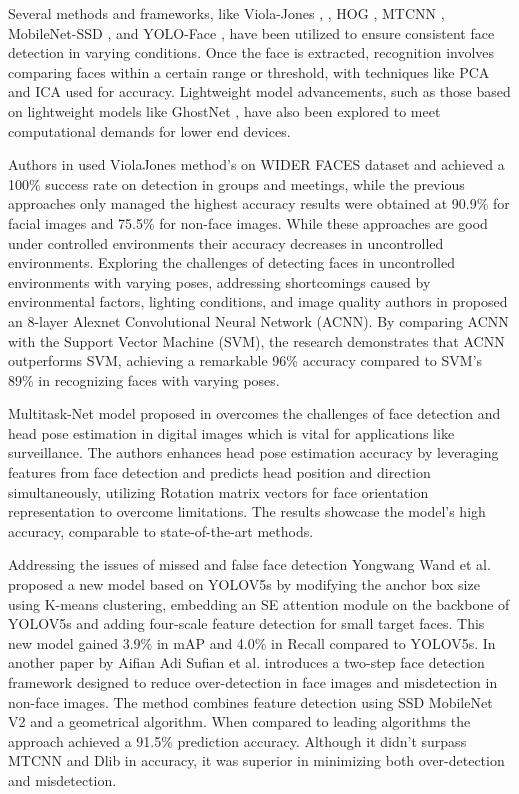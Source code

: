 Several methods and frameworks, like Viola-Jones \cite{sumanto_viola-jones_2022}, \cite{rani_face_2022}, HOG \cite{rani_face_2022}, MTCNN \cite{rani_face_2022}, MobileNet-SSD \cite{chan_face_2022}, and YOLO-Face \cite{wang_yolov5s-face_2022}, have been utilized to ensure consistent face detection in varying conditions. Once the face is extracted, recognition involves comparing faces within a certain range or threshold, with techniques like PCA and ICA used for accuracy. Lightweight model advancements, such as those based on lightweight models like GhostNet \cite{alansari_ghostfacenets_2023}, have also been explored to meet computational demands for lower end devices.

Authors in \cite{sumanto_viola-jones_2022} used ViolaJones method's on WIDER FACES dataset and achieved a 100\% success rate on detection in groups and meetings, while the previous approaches only managed the highest accuracy results were obtained at 90.9\% for facial images and 75.5\% for non-face images. While these approaches are good under controlled environments their accuracy decreases in uncontrolled environments. Exploring the challenges of detecting faces in uncontrolled environments with varying poses, addressing shortcomings caused by environmental factors, lighting conditions, and image quality authors in \cite{mahesh_smart_2022} proposed an 8-layer Alexnet Convolutional Neural Network (ACNN). By comparing ACNN with the Support Vector Machine (SVM), the research demonstrates that ACNN outperforms SVM, achieving a remarkable 96\% accuracy compared to SVM's 89\% in recognizing faces with varying poses.

Multitask-Net model proposed in \cite{viet_simultaneous_2021} overcomes the challenges of face detection and head pose estimation in digital images which is vital for applications like surveillance. The authors enhances head pose estimation accuracy by leveraging features from face detection and predicts head position and direction simultaneously, utilizing Rotation matrix vectors for face orientation representation to overcome limitations. The results showcase the model's high accuracy, comparable to state-of-the-art methods.

Addressing the issues of missed and false face detection Yongwang Wand et al. \cite{wang_yolov5s-face_2022} proposed a new model based on YOLOV5s by modifying the anchor box size using K-means clustering, embedding an SE attention module on the backbone of YOLOV5s and adding four-scale feature detection for small target faces. This new model gained 3.9\% in mAP and 4.0\% in Recall compared to YOLOV5s. In another paper by Aifian Adi Sufian et al. \cite{chan_face_2022} introduces a two-step face detection framework designed to reduce over-detection in face images and misdetection in non-face images. The method combines feature detection using SSD MobileNet V2 and a geometrical algorithm. When compared to leading algorithms the approach achieved a 91.5\% prediction accuracy. Although it didn't surpass MTCNN and Dlib in accuracy, it was superior in minimizing both over-detection and misdetection.

